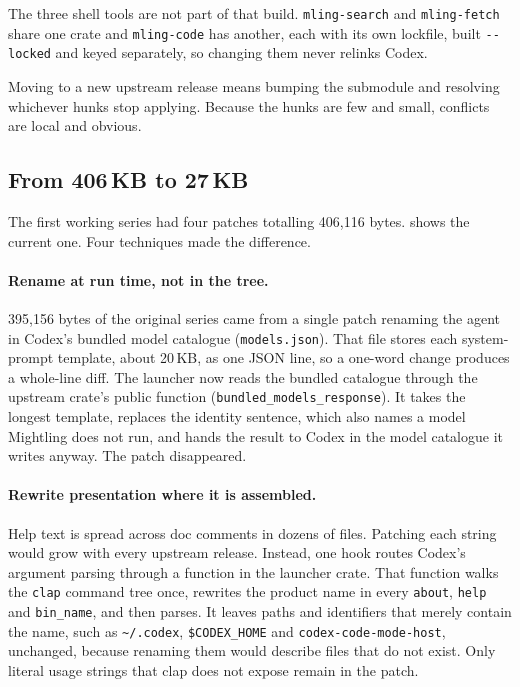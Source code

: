 \documentclass[11pt]{article}
\newcommand{\code}[1]{\texttt{#1}}
\begin{document}
The three shell tools are not part of that build. \code{mling-search} and \code{mling-fetch}
share one crate and \code{mling-code} has another, each with its own lockfile, built
\code{-{}-locked} and keyed separately, so changing them never relinks Codex.

Moving to a new upstream release means bumping the submodule and resolving whichever hunks stop
applying. Because the hunks are few and small, conflicts are local and obvious.

\subsection{From 406\,KB to 27\,KB}

The first working series had four patches totalling 406{,}116 bytes.  shows the
current one. Four techniques made the difference.

\paragraph{Rename at run time, not in the tree.} 395{,}156 bytes of the original series came from a
single patch renaming the agent in Codex's bundled model catalogue (\code{models.json}). That file
stores each system-prompt template, about 20\,KB, as one JSON line, so a one-word change produces a
whole-line diff. The launcher now reads the bundled catalogue through the upstream crate's public
function (\code{bundled\_models\_response}). It takes the longest template, replaces the identity
sentence, which also names a model Mightling does not run, and hands the result to Codex in the model
catalogue it writes anyway. The patch disappeared.

\paragraph{Rewrite presentation where it is assembled.} Help text is spread across doc comments in
dozens of files. Patching each string would grow with every upstream release. Instead, one hook
routes Codex's argument parsing through a function in the launcher crate. That function walks the
\code{clap} command tree once, rewrites the product name in every \code{about}, \code{help} and
\code{bin\_name}, and then parses. It leaves paths and identifiers that merely contain the name,
such as \code{\textasciitilde/.codex}, \code{\$CODEX\_HOME} and \code{codex-code-mode-host}, unchanged,
because renaming them would describe files that do not exist. Only literal usage strings that clap
does not expose remain in the patch.
\end{document}
